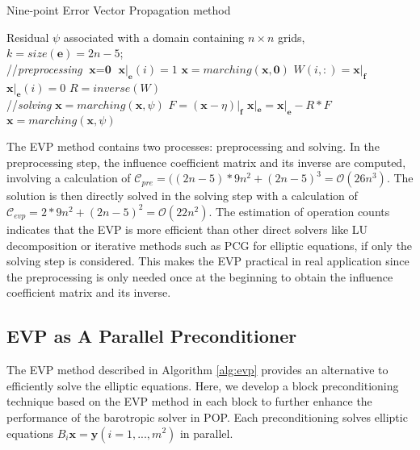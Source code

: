 \begin{algorithm}[!h]
\caption{Nine-point Error Vector Propagation method}
\label{alg:evp}
\begin{algorithmic}[1]
\REQUIRE Residual $\psi$ associated with a domain containing $n\times n$ grids, $k = size(\textbf{e})=2n-5$; \\
//\qquad \textit{preprocessing }
\STATE  $\textbf{x} = \textbf{0}$
\STATE $\textbf{x}|_\textbf{e}(i) = 1$
\STATE $\textbf{x} = marching(\textbf{x},\textbf{0})$
\STATE $W(i,:) = \textbf{x}|_\textbf{f}$
\STATE $\textbf{x}|_\textbf{e}(i) = 0$
\ENDFOR 
\STATE $R = inverse(W)$ \\
//\qquad \textit{solving }
\STATE $\textbf{x}= marching(\textbf{x},\psi)$
\STATE $F = (\textbf{x} - \eta)|_\textbf{f}$
\STATE $\textbf{x}|_\textbf{e} =\textbf{x}|_\textbf{e} - R*F$
\STATE $\textbf{x} = marching(\textbf{x},\psi)$
\end{algorithmic}
\end{algorithm}

The EVP method contains two processes: preprocessing and solving. In the preprocessing step, the influence coefficient matrix
and its inverse are computed, involving a calculation of  $\mathcal{C}_{pre}= ((2n-5)* 9n^2 + (2n-5)^3 = \mathcal {O} (26n^3)$.
The solution is then directly solved in the solving step with a calculation of $\mathcal{C}_{evp}= 2* 9n^2 + (2n-5)^2 = \mathcal{O} (22n^2)$. 
The estimation of operation counts indicates that the EVP is more efficient than other direct solvers like LU decomposition
or iterative methods such as PCG for elliptic equations, if only the solving step is considered.
This makes the EVP practical in real application since the preprocessing is only needed once at the beginning
to obtain the influence coefficient matrix and its inverse.

\subsection{EVP as A Parallel Preconditioner}
The EVP method described in Algorithm \ref{alg:evp} provides an alternative to efficiently solve the elliptic equations.
Here, we develop a block preconditioning technique based on the EVP method in each block to further enhance
the performance of the barotropic solver in POP.
Each preconditioning solves elliptic equations $B_i \textbf{x} = \textbf{y}  (i=1,...,m^2)$ in parallel. 

